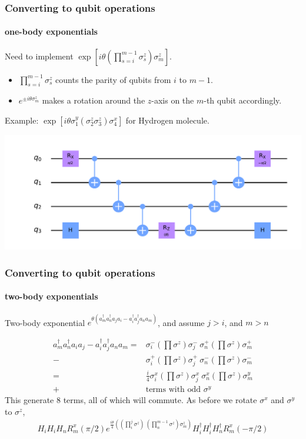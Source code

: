 \documentclass{beamer}
\renewcommand{\(}{\left(}
\renewcommand{\)}{\right)}
\renewcommand{\[}{\left[}
\renewcommand{\]}{\right]}
\begin{document}
\begin{frame}
    \frametitle{Converting to qubit operations}
    \framesubtitle{one-body exponentials}
    Need to implement $\exp\[i\theta \(\prod_{s=i}^{m-1} \sigma_s^z\) \sigma^{z}_m \]$. 
    \begin{itemize}
        \item $\prod_{s=i}^{m-1} \sigma_s^z$ counts the parity of qubits from $i$ to $m-1$. 
        \item $e^{\pm i \theta\sigma^z_m }$ makes a rotation around the $z$-axis on the $m$-th qubit accordingly. 
    \end{itemize}
    \pause
    Example: $\exp\[i\theta \sigma^{y}_1 (\sigma_2^z \sigma_3^z )\sigma^{x}_4 \]$ for Hydrogen molecule.  
    \begin{center}
        \includegraphics[scale = 0.45, trim = 65 0 0 0 , clip]{a_4a_1_r.pdf} 
    \end{center}
\end{frame}

\begin{frame}
    \frametitle{Converting to qubit operations}
    \framesubtitle{two-body exponentials}

    Two-body exponential $e^{\theta (a^\dagger_m a^\dagger_n a_j a_i - a^\dagger_i a^\dagger_j a_n a_m  )}$, and assume $j>i$, and $m>n$ 

    \begin{align*}
        a^\dagger_m a^\dagger_n a_i a_j - a^\dagger_i a^\dagger_j a_n a_m  = &\sigma^{-}_i \(\prod \sigma^{z}\) \sigma^{-}_j\  \sigma^{+}_n \(\prod \sigma^{z}\) \sigma^{+}_m \\ 
        - & \sigma^{+}_i \(\prod \sigma^{z}\) \sigma^{+}_j\  \sigma^{-}_n \(\prod \sigma^{z}\) \sigma^{-}_m \\ 
        = & \frac{i}{4} \sigma^{x}_i \(\prod \sigma^{z}\) \sigma^{x}_j \  \sigma^{x}_n \(\prod \sigma^{z}\) \sigma^{y}_m \\ 
        + &\text{terms with odd } \sigma^{y} 
    \end{align*}
    This generate $8$ terms, all of which will commute. As before we rotate $\sigma^x$ and $\sigma^y$ to $\sigma^{z}$, 
    \begin{align*}
        H_i H_i H_n R^x_m(\pi/2) e^{\frac{i\theta}{4} \(\(\prod_{i}^{j} \sigma^{z}\)\  \(\prod_{n}^{m-1} \sigma^{z}\)  \sigma^{z}_m \)} H^\dagger_i H^\dagger_i H^\dagger_n R^x_m(-\pi/2)
    \end{align*}
    
\end{frame}
\end{document}
